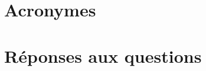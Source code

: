 \documentclass[11pt,fleqn]{book} %
\begin{document}
\chapter*{Acronymes}
\begin{multicols}{2}

\end{multicols}

%
%
%
%
%
%
%

%









\immediate\closeout\tempfile
{}
\chapter{Réponses aux questions}


\printindex


\printbibliography
\end{document}
